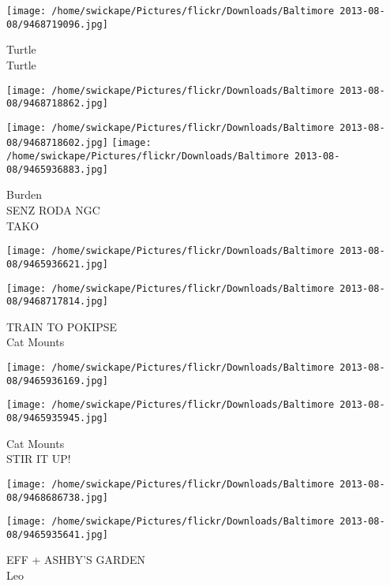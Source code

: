 \documentclass[10pt,letterpaper]{article}
\begin{document}
\vspace{0.25in}
\texttt{[image: /home/swickape/Pictures/flickr/Downloads/Baltimore 2013-08-08/9468719096.jpg]}

Turtle\\
Turtle\\
\pagebreak

\texttt{[image: /home/swickape/Pictures/flickr/Downloads/Baltimore 2013-08-08/9468718862.jpg]}

\vspace{0.25in}
\texttt{[image: /home/swickape/Pictures/flickr/Downloads/Baltimore 2013-08-08/9468718602.jpg]}
\texttt{[image: /home/swickape/Pictures/flickr/Downloads/Baltimore 2013-08-08/9465936883.jpg]}

Burden\\
SENZ RODA NGC\\
TAKO\\
\pagebreak

\texttt{[image: /home/swickape/Pictures/flickr/Downloads/Baltimore 2013-08-08/9465936621.jpg]}

\vspace{0.25in}
\texttt{[image: /home/swickape/Pictures/flickr/Downloads/Baltimore 2013-08-08/9468717814.jpg]}

TRAIN TO POKIPSE\\
Cat Mounts\\
\pagebreak

\texttt{[image: /home/swickape/Pictures/flickr/Downloads/Baltimore 2013-08-08/9465936169.jpg]}

\vspace{0.25in}
\texttt{[image: /home/swickape/Pictures/flickr/Downloads/Baltimore 2013-08-08/9465935945.jpg]}

Cat Mounts\\
STIR IT UP!\\
\pagebreak

\texttt{[image: /home/swickape/Pictures/flickr/Downloads/Baltimore 2013-08-08/9468686738.jpg]}

\vspace{0.25in}
\texttt{[image: /home/swickape/Pictures/flickr/Downloads/Baltimore 2013-08-08/9465935641.jpg]}

EFF + ASHBY'S GARDEN\\
Leo\\
\pagebreak
\end{document}
